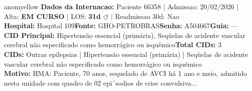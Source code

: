 \documentclass[a4paper,10pt]{article}
\begin{document}
\begin{anomalycard}[Internacao 166180 | GHO-PETROBRAS | MODERADO (z=2.70)]{anomyellow}
\textbf{Dados da Internacao:} Paciente 66358 $\mid$ Admissao: 20/02/2026 $\mid$ Alta: \textcolor{anomorange}{\textbf{EM CURSO}} $\mid$ LOS: \textbf{31d \textcolor{anomorange}{$\circlearrowleft$}} $\mid$ Readmissao 30d: Nao\\
\textbf{Hospital:} Hospital 109\quad\textbf{Fonte:} GHO-PETROBRAS\quad\textbf{Senha:} A504667\quad\textbf{Guia:} ---\\
\textbf{CID Principal:} {\small Hipertensão essencial (primária), Seqüelas de acidente vascular cerebral não especificado como hemorrágico ou isquêmico}\quad\textbf{Total CIDs:} 3\\

\textbf{CIDs:} {\scriptsize Outras epilepsias | Hipertensão essencial (primária) | Seqüelas de acidente vascular cerebral não especificado como hemorrágico ou isquêmico}\\

\textbf{Motivo:} {\scriptsize HMA: Paciente, 70 anos, sequelado de AVCI há 1 ano e meio,  admitido nesta unidade com quadro de 02 epi´sodios de crise convulsiva...}\\


\end{anomalycard}
\end{document}
